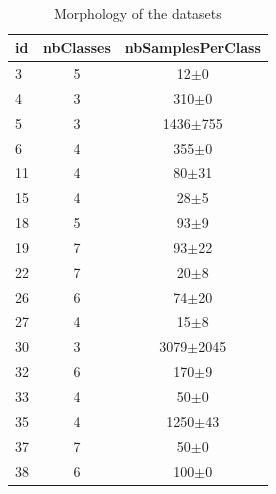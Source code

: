   
\begin{table} 
\begin{center} 
\ 
 \setlength{\tabcolsep}{.16667em} 
\begin{tabular}{lcc} 
id & nbClasses & nbSamplesPerClass \\ 
\hline 
 3 & 5 &      12$\pm$0 \\ 
 4 & 3 &     310$\pm$0 \\ 
 5 & 3 &  1436$\pm$755 \\ 
 6 & 4 &     355$\pm$0 \\ 
11 & 4 &     80$\pm$31 \\ 
15 & 4 &      28$\pm$5 \\ 
18 & 5 &      93$\pm$9 \\ 
19 & 7 &     93$\pm$22 \\ 
22 & 7 &      20$\pm$8 \\ 
26 & 6 &     74$\pm$20 \\ 
27 & 4 &      15$\pm$8 \\ 
30 & 3 & 3079$\pm$2045 \\ 
32 & 6 &     170$\pm$9 \\ 
33 & 4 &      50$\pm$0 \\ 
35 & 4 &   1250$\pm$43 \\ 
37 & 7 &      50$\pm$0 \\ 
38 & 6 &     100$\pm$0 \\ 
\end{tabular} 
\end{center} 
\caption{Morphology of the datasets} 
\label{didtNoda1} 
\end{table} 
 
